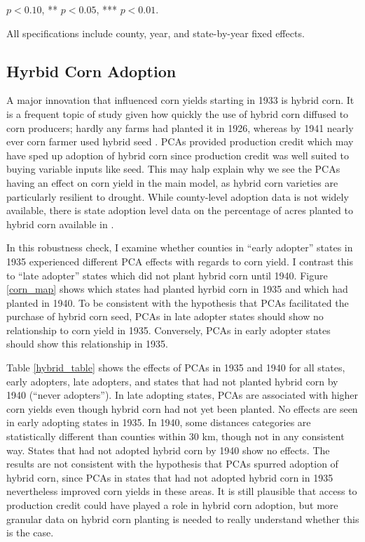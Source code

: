 \documentclass[12pt]{article}
\begin{document}
\begin{appendices}
\begin{table}
\begin{threeparttable}[t]
  \begin{tablenotes}
    \item {\footnotesize * \(p<0.10\), ** \(p<0.05\), *** \(p<0.01\).}
    \item {\footnotesize All specifications include county, year, and state-by-year fixed effects.}
  \end{tablenotes}
\end{threeparttable}
\end{table}

\subsection{Hyrbid Corn Adoption}
\label{appendix:hybrid}
A major innovation that influenced corn yields starting in 1933 is hybrid corn.
It is a frequent topic of study given how quickly the use of hybrid corn diffused to corn producers; hardly any farms had planted it in 1926, whereas by 1941 nearly ever corn farmer used hybrid seed \citep{griliches1960hybrid,ryan1950acceptance}.
PCAs provided production credit which may have sped up adoption of hybrid corn since production credit was well suited to buying variable inputs like seed.
This may halp explain why we see the PCAs having an effect on corn yield in the main model, as hybrid corn varieties are particularly resilient to drought.
While county-level adoption data is not widely available, there is state adoption level data on the percentage of acres planted to hybrid corn available in \citet{nass_agricultural_1945}.

In this robustness check, I examine whether counties in ``early adopter'' states in 1935 experienced different PCA effects with regards to corn yield.
I contrast this to ``late adopter'' states which did not plant hybrid corn until 1940. 
Figure \ref{corn_map} shows which states had planted hyrbid corn in 1935 and which had planted in 1940.
To be consistent with the hypothesis that PCAs facilitated the purchase of hybrid corn seed, PCAs in late adopter states should show no relationship to corn yield in 1935.
Conversely, PCAs in early adopter states should show this relationship in 1935.

Table \ref{hybrid_table} shows the effects of PCAs in 1935 and 1940 for all states, early adopters, late adopters, and states that had not planted hybrid corn by 1940 (``never adopters'').
In late adopting states, PCAs are associated with higher corn yields even though hybrid corn had not yet been planted. 
No effects are seen in early adopting states in 1935.
In 1940, some distances categories are statistically different than counties within 30 km, though not in any consistent way.
States that had not adopted hybrid corn by 1940 show no effects.
The results are not consistent with the hypothesis that PCAs spurred adoption of hybrid corn, since PCAs in states that had not adopted hybrid corn in 1935 nevertheless improved corn yields in these areas.
It is still plausible that access to production credit could have played a role in hybrid corn adoption, but more granular data on hybrid corn planting is needed to really understand whether this is the case.



\end{appendices}
\end{document}
